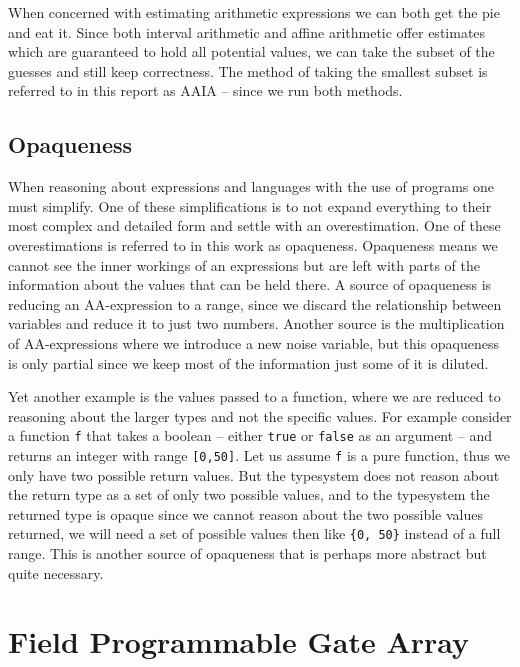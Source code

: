 When concerned with estimating arithmetic expressions we can both get the pie and eat it. Since both interval arithmetic and affine arithmetic offer estimates which are guaranteed to hold all potential values, we can take the subset of the guesses and still keep correctness. The method of taking the smallest subset is referred to in this report as AAIA -- since we run both methods.

\subsection{Opaqueness}
When reasoning about expressions and languages with the use of programs one must simplify. One of these simplifications is to not expand everything to their most complex and detailed form and settle with an overestimation. One of these overestimations is referred to in this work as opaqueness. Opaqueness means we cannot see the inner workings of an expressions but are left with parts of the information about the values that can be held there. A source of opaqueness is reducing an AA-expression to a range, since we discard the relationship between variables and reduce it to just two numbers. Another source is the multiplication of AA-expressions where we introduce a new noise variable, but this opaqueness is only partial since we keep most of the information just some of it is diluted.

Yet another example is the values passed to a function, where we are reduced to reasoning about the larger types and not the specific values. For example consider a function \verb+f+ that takes a boolean -- either \verb+true+ or \verb+false+ as an argument -- and returns an integer with range \verb+[0,50]+. Let us assume \verb+f+ is a pure function, thus we only have two possible return values. But the typesystem does not reason about the return type as a set of only two possible values, and to the typesystem the returned type is opaque since we cannot reason about the two possible values returned, we will need a set of possible values then like \verb+{0, 50}+ instead of a full range. This is another source of opaqueness that is perhaps more abstract but quite necessary.

\section{Field Programmable Gate Array}


